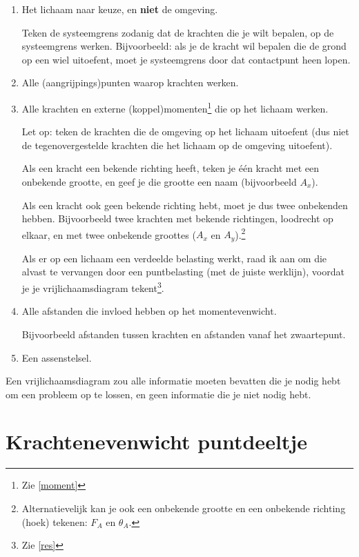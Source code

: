 \documentclass{article}
\begin{document}
\begin{enumerate}
    \item Het lichaam naar keuze, en \textbf{niet} de omgeving. 
    
    Teken de systeemgrens zodanig dat de krachten die je wilt bepalen, op de systeemgrens werken. Bijvoorbeeld: als je de kracht wil bepalen die de grond op een wiel uitoefent, moet je systeemgrens door dat contactpunt heen lopen.

    \item Alle (aangrijpings)punten waarop krachten werken.

    \item Alle krachten en externe (koppel)momenten\footnote{Zie \autoref{moment}} die op het lichaam werken.

    Let op: teken de krachten die de omgeving op het lichaam uitoefent (dus niet de tegenovergestelde krachten die het lichaam op de omgeving uitoefent).

    Als een kracht een bekende richting heeft, teken je één kracht met een onbekende grootte, en geef je die grootte een naam (bijvoorbeeld $A_x$).

    Als een kracht ook geen bekende richting hebt, moet je dus twee onbekenden hebben. Bijvoorbeeld twee krachten met bekende richtingen, loodrecht op elkaar, en met twee onbekende groottes ($A_x$ en $A_y$).\footnote{Alternatievelijk kan je ook een onbekende grootte en een onbekende richting (hoek) tekenen: $F_A$ en $\theta_A$.}

    Als er op een lichaam een verdeelde belasting werkt, raad ik aan om die alvast te vervangen door een puntbelasting (met de juiste werklijn), voordat je je vrijlichaamsdiagram tekent\footnote{Zie \autoref{res}}.

    \item Alle afstanden die invloed hebben op het momentevenwicht.

    Bijvoorbeeld afstanden tussen krachten en afstanden vanaf het zwaartepunt.

    \item Een assenstelsel.
\end{enumerate}

Een vrijlichaamsdiagram zou alle informatie moeten bevatten die je nodig hebt om een probleem op te lossen, en geen informatie die je niet nodig hebt.

\section{Krachtenevenwicht puntdeeltje}
\end{document}
